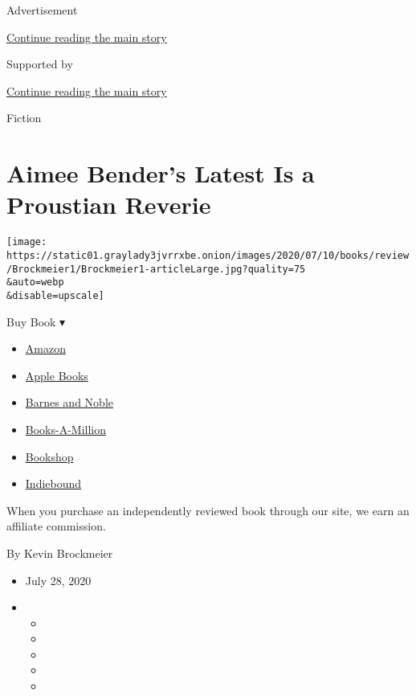 Advertisement

\protect\hyperlink{after-top}{Continue reading the main story}

Supported by

\protect\hyperlink{after-sponsor}{Continue reading the main story}

Fiction

\hypertarget{aimee-benders-latest-is-a-proustian-reverie}{%
\section{Aimee Bender's Latest Is a Proustian
Reverie}\label{aimee-benders-latest-is-a-proustian-reverie}}

\texttt{[image: https://static01.graylady3jvrrxbe.onion/images/2020/07/10/books/review/Brockmeier1/Brockmeier1-articleLarge.jpg?quality=75\\\&auto=webp\\\&disable=upscale]}

Buy Book ▾

\begin{itemize}
\tightlist
\item
  \href{https://www.amazon.com/gp/search?index=books\&tag=NYTBSREV-20\&field-keywords=The+Butterfly+Lampshade+Aimee+Bender}{Amazon}
\item
  \href{https://du-gae-books-dot-nyt-du-prd.appspot.com/buy?title=The+Butterfly+Lampshade\&author=Aimee+Bender}{Apple
  Books}
\item
  \href{https://www.anrdoezrs.net/click-7990613-11819508?url=https\%3A\%2F\%2Fwww.barnesandnoble.com\%2Fw\%2F\%3Fean\%3D9780385534871}{Barnes
  and Noble}
\item
  \href{https://www.anrdoezrs.net/click-7990613-35140?url=https\%3A\%2F\%2Fwww.booksamillion.com\%2Fp\%2FThe\%2BButterfly\%2BLampshade\%2FAimee\%2BBender\%2F9780385534871}{Books-A-Million}
\item
  \href{https://bookshop.org/a/3546/9780385534871}{Bookshop}
\item
  \href{https://www.indiebound.org/book/9780385534871?aff=NYT}{Indiebound}
\end{itemize}

When you purchase an independently reviewed book through our site, we
earn an affiliate commission.

By Kevin Brockmeier

\begin{itemize}
\item
  July 28, 2020
\item
  \begin{itemize}
  \item
  \item
  \item
  \item
  \item
  \end{itemize}
\end{itemize}

